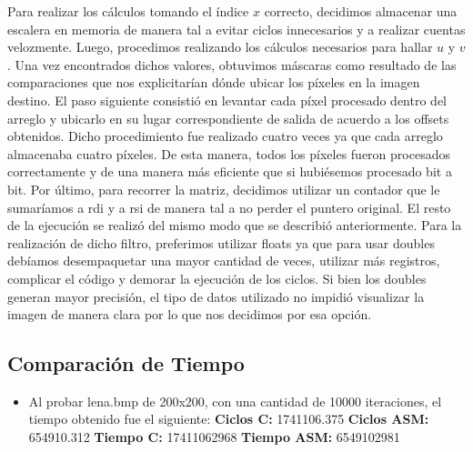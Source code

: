 \documentclass[10pt, a4paper]{article}
\begin{document}
\begin{itemize}
Para realizar los cálculos tomando el índice $x$ correcto, decidimos almacenar una escalera en memoria de manera tal a evitar ciclos innecesarios y a realizar cuentas velozmente.\newline
Luego, procedimos realizando los cálculos necesarios para hallar $u$ y $v$. Una vez encontrados dichos valores, obtuvimos máscaras como resultado de las comparaciones que nos explicitarían dónde ubicar los píxeles en la imagen destino.\newline
El paso siguiente consistió en levantar cada píxel procesado dentro del arreglo y ubicarlo en su lugar correspondiente de salida de acuerdo a los offsets obtenidos. Dicho procedimiento fue realizado cuatro veces ya que cada arreglo almacenaba cuatro píxeles. De esta manera, todos los píxeles fueron procesados correctamente y de una manera más eficiente que si hubiésemos procesado bit a bit.\newline
Por último, para recorrer la matriz, decidimos utilizar un contador que le sumaríamos a rdi y a rsi de manera tal a no perder el puntero original. El resto de la ejecución se realizó del mismo modo que se describió anteriormente.\newline
Para la realización de dicho filtro, preferimos utilizar floats ya que para usar doubles debíamos desempaquetar una mayor cantidad de veces, utilizar más registros, complicar el código y demorar la ejecución de los ciclos. Si bien los doubles generan mayor precisión, el tipo de datos utilizado no impidió visualizar la imagen de manera clara por lo que nos decidimos por esa opción.

\subsection{Comparación de Tiempo}

\begin{itemize}

\item{Al probar lena.bmp de 200x200, con una cantidad de 10000 iteraciones, el tiempo obtenido fue el siguiente:\newline
\newline
\textbf{Ciclos C:}                  1741106.375\newline
\vspace{0.15cm}
\textbf{Ciclos ASM:}               654910.312\newline
\textbf{Tiempo C:}                 17411062968\newline
\textbf{Tiempo ASM:}               6549102981\newline}


\end{itemize}
\end{itemize}
\end{document}
